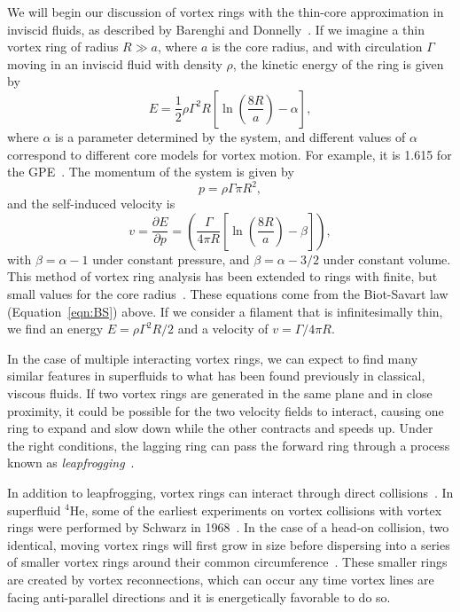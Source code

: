 We will begin our discussion of vortex rings with the thin-core approximation in inviscid fluids, as described by Barenghi and Donnelly~\cite{barenghi2009}. 
If we imagine a thin vortex ring of radius $R\gg a$, where $a$ is the core radius, and  with circulation $\Gamma$ moving in an inviscid fluid with density $\rho$, the kinetic energy of the ring is given by
\begin{equation}
    E = \frac 1 2 \rho \Gamma^2R\left[\ln\left(\frac{8R}{a}\right)-\alpha\right],
\end{equation}
where $\alpha$ is a parameter determined by the system, and different
values of $\alpha$ correspond to different core models for vortex motion. 
For example, it is 1.615 for the GPE~\cite{roberts1971}.
The momentum of the system is given by
\begin{equation}
    p = \rho \Gamma \pi R^2,
\end{equation}
and the self-induced velocity is~\cite{roberts1970}
\begin{equation}
    v = \frac{\partial E}{\partial p} = \left(\frac{\Gamma}{4 \pi R}\left[\ln(\frac{8R}{a})-\beta\right]\right),
\end{equation}
with $\beta = \alpha - 1$ under constant pressure, and $\beta = \alpha - 3/2$ under constant volume. 
This method of vortex ring analysis has been extended to rings with finite, but small values for the core radius~\cite{fraenkel1970, fraenkel1972}.
These equations come from the Biot-Savart law (Equation~\eqref{eqn:BS}) above.
If we consider a filament that is infinitesimally thin, we find an energy $E = \rho \Gamma^2 R/2$ and a velocity of $v = \Gamma / 4 \pi R$.

In the case of multiple interacting vortex rings, we can expect to find many similar features in superfluids to what has been found previously in classical, viscous fluids. 
If two vortex rings are generated in the same plane and in close proximity, it could be possible for the two velocity fields to interact, causing one ring to expand and slow down while the other contracts and speeds up. 
Under the right conditions, the lagging ring can pass the forward ring through a process known as \textit{leapfrogging}~\cite{sommerfield1950, caplan2014}.

In addition to leapfrogging, vortex rings can interact through direct collisions~\cite{shariff1992}. 
In superfluid $^4$He, some of the earliest experiments on vortex collisions with vortex rings were performed by Schwarz in 1968~\cite{schwarz1968}.
In the case of a head-on collision, two identical, moving vortex rings will first grow in size before dispersing into a series of smaller vortex rings around their common circumference~\cite{lim1995}. 
These smaller rings are created by vortex reconnections, which can occur any time vortex lines are facing anti-parallel directions and it is energetically favorable to do so.

